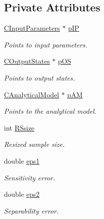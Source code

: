 \subsection*{Private Attributes}
\begin{DoxyCompactItemize}
\item 
\hyperlink{class_go_s_u_m_1_1_c_input_parameters}{C\-Input\-Parameters} $\ast$ \hyperlink{class_go_s_u_m_1_1_c_sensitivity_analysis_acd625d19c687c2fc95ec3c086bd55d40}{p\-I\-P}
\begin{DoxyCompactList}\small\item\em Points to input parameters. \end{DoxyCompactList}\item 
\hyperlink{class_go_s_u_m_1_1_c_output_states}{C\-Output\-States} $\ast$ \hyperlink{class_go_s_u_m_1_1_c_sensitivity_analysis_ad8bdf2806f9226a5fcadc18b02345c11}{p\-O\-S}
\begin{DoxyCompactList}\small\item\em Points to output states. \end{DoxyCompactList}\item 
\hyperlink{class_go_s_u_m_1_1_c_analytical_model}{C\-Analytical\-Model} $\ast$ \hyperlink{class_go_s_u_m_1_1_c_sensitivity_analysis_a5830e671d4f07bf47cf6f5093226589f}{p\-A\-M}
\begin{DoxyCompactList}\small\item\em Points to the analytical model. \end{DoxyCompactList}\item 
int \hyperlink{class_go_s_u_m_1_1_c_sensitivity_analysis_ae6a6354b8d61c87328715d89bd2e34eb}{R\-Ssize}
\begin{DoxyCompactList}\small\item\em Resized sample size. \end{DoxyCompactList}\item 
double \hyperlink{class_go_s_u_m_1_1_c_sensitivity_analysis_a4d493ceaedd73ca46b740a3f64b39a41}{eps1}
\begin{DoxyCompactList}\small\item\em Sensitivity error. \end{DoxyCompactList}\item 
double \hyperlink{class_go_s_u_m_1_1_c_sensitivity_analysis_ac007c702d7002b57e42cdca9bb40c66c}{eps2}
\begin{DoxyCompactList}\small\item\em Separability error. \end{DoxyCompactList}\item 

\end{DoxyCompactItemize}
